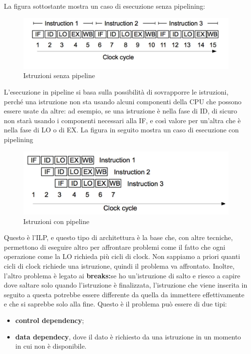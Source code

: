 \documentclass[12pt, oneside]{extbook}
\begin{document}
La figura sottostante mostra un caso di esecuzione senza pipelining:
\begin{figure}[!h]
\includegraphics[scale=0.3]{immagini/no-pipeline}
\caption{Istruzioni senza pipeline}
\end{figure}
L'esecuzione in pipeline si basa sulla possibilità di sovrapporre le istruzioni, perché una istruzione non sta usando alcuni componenti della CPU che possono essere usate da altre: ad esempio, se una istruzione è nella fase di ID, di sicuro non starà usando i componenti necessari alla IF, e così valore per un'altra che è nella fase di LO o di EX. La figura in seguito mostra un caso di esecuzione con pipelining 
\begin{figure}[ht!]
\includegraphics[scale=0.3]{immagini/pipeline}
\caption{Istruzioni con pipeline}
\end{figure}
Questo è l'ILP, e questo tipo di architettura è la base che, con altre tecniche, permettono di eseguire altro per affrontare problemi come il fatto che ogni operazione come la LO richieda più cicli di clock. Non sappiamo a priori quanti cicli di clock richiede una istruzione, quindi il problema va affrontato. Inoltre, l'altro problema è legato ai \textbf{breaks:}se ho un'istruzione di salto e riesco a capire dove saltare solo quando l'istruzione è finalizzata, l'istruzione che viene inserita in seguito a questa potrebbe essere differente da quella da immettere effettivamente e che si saprebbe solo alla fine. Questo è il problema può essere di due tipi:
\begin{itemize}
\item \textbf{control dependency};
\item \textbf{data dependecy}, dove il dato è richiesto da una istruzione in un momento in cui non è disponibile.
\end{itemize} 
\end{document}
